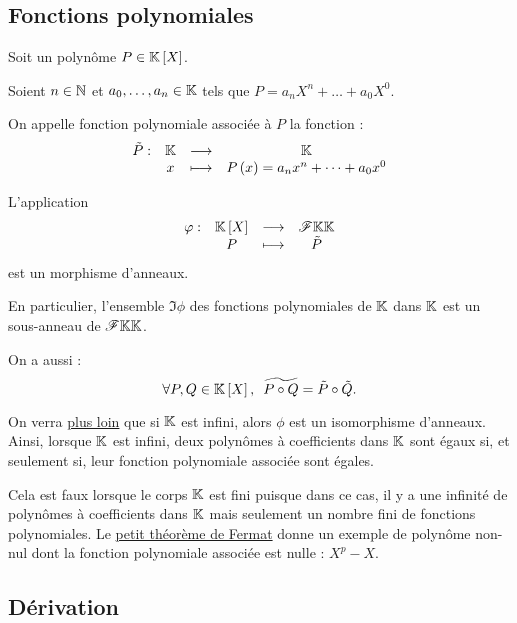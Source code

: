 \subsection{Fonctions polynomiales}

\begin{defi}
Soit un polynôme \(P\in\poly\).

Soient \(n\in\mathbb{N}\) et \(a_0,\dots,a_n\in\mathbb{K}\) tels que \(P=a_nX^n+\dots+a_0X^0\).

On appelle fonction polynomiale associée à \(P\) la fonction : \[\begin{array}[t]{cccc}\tilde{P} : & \mathbb{K} & \longrightarrow & \mathbb{K} \\ & x & \longmapsto & P\left(x\right)=a_nx^n+\dots+a_0x^0\end{array}\]
\end{defi}

\begin{prop}
L'application \[\fonction{\phi}{\poly}{\F{\K}{\K}}{P}{\tilde{P}}\] est un morphisme d'anneaux.

En particulier, l'ensemble \(\Im\phi\) des fonctions polynomiales de \(\mathbb{K}\) dans \(\mathbb{K}\) est un sous-anneau de \(\mathscr{F}{\mathbb{K}}{\mathbb{K}}\).
\end{prop}

\begin{dem}
\end{dem}

\begin{rem}
On a aussi : \[\quantifs{\forall P,Q\in\poly}\widetilde{P\rond Q}=\tilde{P}\rond\tilde{Q}.\]
\end{rem}

\begin{rem}
On verra \hyperref[subsec:nbRacinesPoly]{plus loin} que si \(\mathbb{K}\) est infini, alors \(\phi\) est un isomorphisme d'anneaux. Ainsi, lorsque \(\mathbb{K}\) est infini, deux polynômes à coefficients dans \(\mathbb{K}\) sont égaux si, et seulement si, leur fonction polynomiale associée sont égales.

Cela est faux lorsque le corps \(\mathbb{K}\) est fini puisque dans ce cas, il y a une infinité de polynômes à coefficients dans \(\mathbb{K}\) mais seulement un nombre fini de fonctions polynomiales. Le \hyperref[theo:petitThéorèmeDeFermat]{petit théorème de Fermat} donne un exemple de polynôme non-nul dont la fonction polynomiale associée est nulle : \(X^p-X\).
\end{rem}

\subsection{Dérivation}

